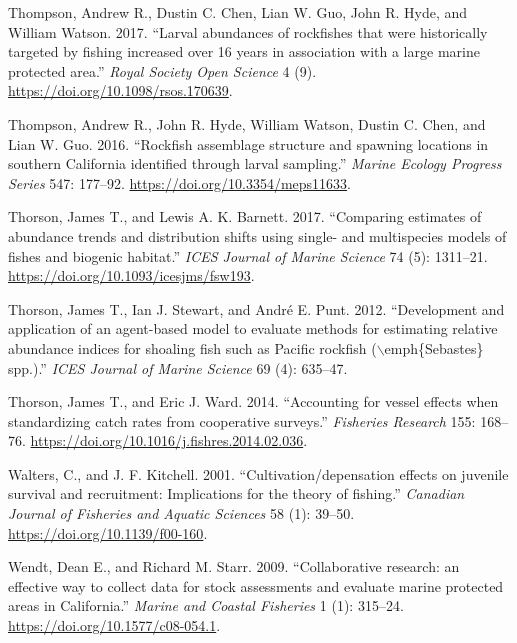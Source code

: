 \documentclass[
  english,
  a4paper,
]{article}
\newlength{\cslhangindent}
\newlength{\cslentryspacingunit} %
\newenvironment{CSLReferences}[2] %
 {%
  \setlength{\parindent}{0pt}
  \ifodd #1
  \let\oldpar\par
  \def\par{\hangindent=\cslhangindent\oldpar}
  \fi
  \setlength{\parskip}{#2\cslentryspacingunit}
 }%
 {}
\begin{document}
\begin{CSLReferences}{1}{0}
\leavevmode{}%
Thompson, Andrew R., Dustin C. Chen, Lian W. Guo, John R. Hyde, and William Watson. 2017. {``{Larval abundances of rockfishes that were historically targeted by fishing increased over 16 years in association with a large marine protected area}.''} \emph{Royal Society Open Science} 4 (9). \url{https://doi.org/10.1098/rsos.170639}.

\leavevmode{}%
Thompson, Andrew R., John R. Hyde, William Watson, Dustin C. Chen, and Lian W. Guo. 2016. {``{Rockfish assemblage structure and spawning locations in southern California identified through larval sampling}.''} \emph{Marine Ecology Progress Series} 547: 177--92. \url{https://doi.org/10.3354/meps11633}.

\leavevmode{}%
Thorson, James T., and Lewis A. K. Barnett. 2017. {``{Comparing estimates of abundance trends and distribution shifts using single- and multispecies models of fishes and biogenic habitat}.''} \emph{ICES Journal of Marine Science} 74 (5): 1311--21. \url{https://doi.org/10.1093/icesjms/fsw193}.

\leavevmode{}%
Thorson, James T., Ian J. Stewart, and André E. Punt. 2012. {``{Development and application of an agent-based model to evaluate methods for estimating relative abundance indices for shoaling fish such as Pacific rockfish (\(\backslash\)emph{\{}Sebastes{\}} spp.)}.''} \emph{ICES Journal of Marine Science} 69 (4): 635--47.

\leavevmode{}%
Thorson, James T., and Eric J. Ward. 2014. {``{Accounting for vessel effects when standardizing catch rates from cooperative surveys}.''} \emph{Fisheries Research} 155: 168--76. \url{https://doi.org/10.1016/j.fishres.2014.02.036}.

\leavevmode{}%
Walters, C., and J. F. Kitchell. 2001. {``{Cultivation/depensation effects on juvenile survival and recruitment: Implications for the theory of fishing}.''} \emph{Canadian Journal of Fisheries and Aquatic Sciences} 58 (1): 39--50. \url{https://doi.org/10.1139/f00-160}.

\leavevmode{}%
Wendt, Dean E., and Richard M. Starr. 2009. {``{Collaborative research: an effective way to collect data for stock assessments and evaluate marine protected areas in California}.''} \emph{Marine and Coastal Fisheries} 1 (1): 315--24. \url{https://doi.org/10.1577/c08-054.1}.


\end{CSLReferences}
\end{document}
